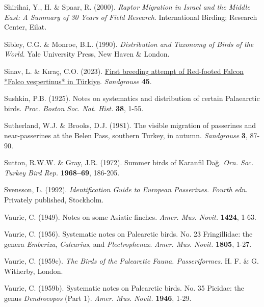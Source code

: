 \documentclass[
  10.5pt,
  a4paper,
  DIV=11,
  numbers=noendperiod,
  twocolumn]{scrreprt}
\newlength{\cslhangindent}
\newenvironment{CSLReferences}[2] %
 {\begin{list}{}{%
  \setlength{\itemindent}{0pt}
  \setlength{\leftmargin}{0pt}
  \setlength{\parsep}{0pt}
  \ifodd #1
   \setlength{\leftmargin}{\cslhangindent}
   \setlength{\itemindent}{-1\cslhangindent}
  \fi
  \setlength{\itemsep}{#2\baselineskip}}}
 {\end{list}}
\begin{document}
\begin{CSLReferences}{1}{1}
Shirihai, Y., H. \& Spaar, R. (2000). \emph{{Raptor Migration in Israel
and the Middle East: A Summary of 30 Years of Field Research}}.
International Birding; Research Center, Eilat.

Sibley, C.G. \& Monroe, B.L. (1990). \emph{{Distribution and Taxonomy of
Birds of the World}}. Yale University Press, New Haven \& London.

Sinav, L. \& Kıraç, C.O. (2023).
\href{https://www.researchgate.net/publication/371957863_First_breeding_attempt_of_Red-footed_Falcon_Falco_vespertinus_in_Turkiye}{{First
breeding attempt of Red-footed Falcon *Falco vespertinus* in Türkiye}}.
\emph{Sandgrouse} \textbf{45}.

Sushkin, P.B. (1925). {Notes on systematics and distribution of certain
Palaearctic birds}. \emph{Proc. Boston Soc. Nat. Hist.} \textbf{38},
1-55.

Sutherland, W.J. \& Brooks, D.J. (1981). {The visible migration of
passerines and near-passerines at the Belen Pass, southern Turkey, in
autumn}. \emph{Sandgrouse} \textbf{3}, 87-90.

Sutton, R.W.W. \& Gray, J.R. (1972). {Summer birds of Karanfil Dağ}.
\emph{Orn. Soc. Turkey Bird Rep.} \textbf{1968--69}, 186-205.

Svensson, L. (1992). \emph{{Identification Guide to European Passerines.
Fourth edn.}} Privately published, Stockholm.

Vaurie, C. (1949). {Notes on some Asiatic finches}. \emph{Amer. Mus.
Novit.} \textbf{1424}, 1-63.

Vaurie, C. (1956). {Systematic notes on Palearctic birds. No. 23
Fringillidae: the genera \emph{Emberiza}, \emph{Calcarius}, and
\emph{Plectrophenax}}. \emph{Amer. Mus. Novit.} \textbf{1805}, 1-27.

Vaurie, C. (1959c). \emph{{The Birds of the Palearctic Fauna.
Passeriformes}}. H. F. \& G. Witherby, London.

Vaurie, C. (1959b). {Systematic notes on Palearctic birds. No. 35
Picidae: the genus \emph{Dendrocopos} (Part 1)}. \emph{Amer. Mus.
Novit.} \textbf{1946}, 1-29.


\end{CSLReferences}
\end{document}

